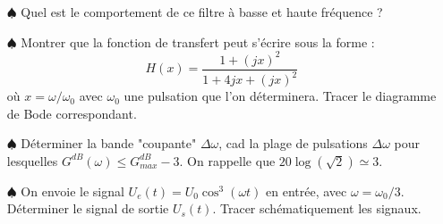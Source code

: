\begin{enumerate}

	\item[$\spadesuit$] Quel est le comportement de ce filtre à basse et haute fréquence ? 
	
	\item[$\spadesuit$] Montrer que la fonction de transfert peut s'écrire sous la forme :
	\begin{equation}
		H(x) =\frac{1+(jx)^2}{1+4jx + (jx)^2}
	\end{equation}
	où $x=\omega/\omega_0$ avec $\omega_0$ une pulsation que l'on déterminera. Tracer le diagramme de Bode correspondant. 
	
	\item[$\spadesuit$] Déterminer la bande "coupante" $\Delta\omega$, cad la plage de pulsations $\Delta\omega$ pour lesquelles $G^{dB}(\omega)\leq G^{dB}_{max} - 3$. On rappelle que $20\log\left( \sqrt{2}\right)\simeq3 $.
	
	\item[$\spadesuit$] On envoie le signal $U_e(t)=U_0\cos^3(\omega t)$ en entrée, avec $\omega=\omega_0/3$. Déterminer le signal de sortie $U_s(t)$. Tracer schématiquement les signaux.

\end{enumerate}

\newpage

